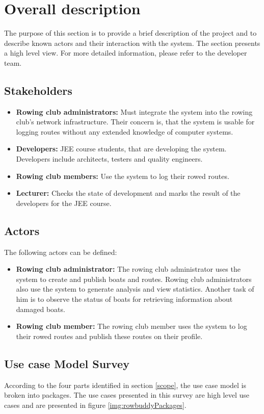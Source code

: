 \section{Overall description}
The purpose of this section is to provide a brief description of the project and to describe known actors and their interaction with the system. The section presents a high level view. For more detailed information, please refer to the developer team.

	\subsection{Stakeholders}
	\begin{itemize}
		\item \textbf{Rowing club administrators:} Must integrate the system into the rowing club's network infrastructure. Their concern is, that the system is usable for logging routes without any extended knowledge of computer systems.
		\item \textbf{Developers:} JEE course students, that are developing the system. Developers include architects, testers and quality engineers.
		\item \textbf{Rowing club members:} Use the system to log their rowed routes.
		\item \textbf{Lecturer:} Checks the state of development and marks the result of the developers for the JEE course.
	\end{itemize}
	
	\subsection{Actors}
	The following actors can be defined:\\
	
	\begin{itemize}
		\item \textbf{Rowing club administrator:} The rowing club administrator uses the system to create and publish boats and routes. Rowing club administrators also use the system to generate analysis and view statistics. Another task of him is to observe the status of boats for retrieving information about damaged boats.
		\item \textbf{Rowing club member:} The rowing club member uses the system to log their rowed routes and publish these routes on their profile.
	\end{itemize}
	
	
	\subsection{Use case Model Survey}
	According to the four parts identified in section \ref{scope}, the use case model is broken into packages. The use cases presented in this survey are high level use cases and are presented in figure \ref{img:rowbuddyPackages}.
	
